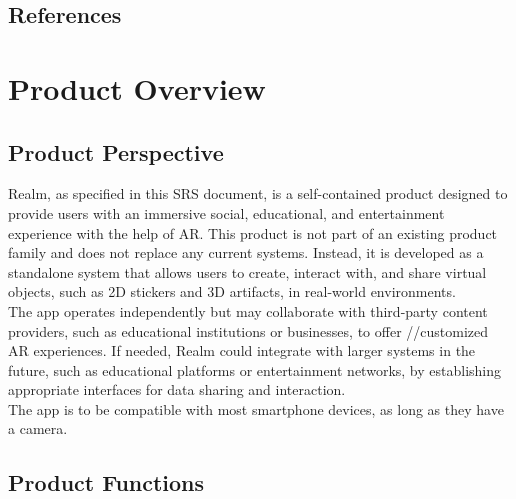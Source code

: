 \documentclass{article}
\begin{document}
\subsection{References}
\label{sub:references}

\begingroup
\raggedright

\endgroup



\section{Product Overview}

\subsection{Product Perspective}

Realm, as specified in this SRS document, is a self-contained product designed to provide users with an immersive social, educational, and entertainment experience with the help of AR. This product is not part of an existing product family and does not replace any current systems. Instead, it is developed as a standalone system that allows users to create, interact with, and share virtual objects, such as 2D stickers and 3D artifacts, in real-world environments.\\

The app operates independently but may collaborate with third-party content providers, such as educational institutions or businesses, to offer //customized AR experiences. If needed, Realm could integrate with larger systems in the future, such as educational platforms or entertainment networks, by establishing appropriate interfaces for data sharing and interaction.\\

The app is to be compatible with most smartphone devices, as long as they have a camera.


\subsection{Product Functions}
\end{document}
